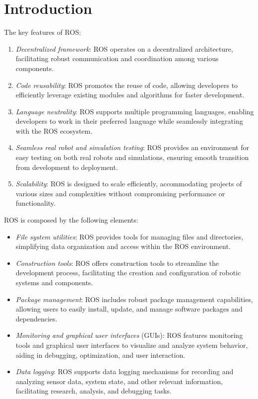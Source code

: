 \section{Introduction}

The key features of ROS:
\begin{enumerate}
    \item \textit{Decentralized framework}: ROS operates on a decentralized architecture, facilitating robust communication and coordination among various components.
    \item \textit{Code reusability}: ROS promotes the reuse of code, allowing developers to efficiently leverage existing modules and algorithms for faster development.
    \item \textit{Language neutrality}: ROS supports multiple programming languages, enabling developers to work in their preferred language while seamlessly integrating with the ROS ecosystem.
    \item \textit{Seamless real robot and simulation testing}: ROS provides an environment for easy testing on both real robots and simulations, ensuring smooth transition from development to deployment.
    \item \textit{Scalability}: ROS is designed to scale efficiently, accommodating projects of various sizes and complexities without compromising performance or functionality.
\end{enumerate}
ROS is composed by the following elements: 
\begin{itemize}
    \item \textit{File system utilities}: ROS provides tools for managing files and directories, simplifying data organization and access within the ROS environment.
    \item \textit{Construction tools}: ROS offers construction tools to streamline the development process, facilitating the creation and configuration of robotic systems and components.
    \item \textit{Package management}: ROS includes robust package management capabilities, allowing users to easily install, update, and manage software packages and dependencies.
    \item \textit{Monitoring and graphical user interfaces} (GUIs): ROS features monitoring tools and graphical user interfaces to visualize and analyze system behavior, aiding in debugging, optimization, and user interaction.
    \item \textit{Data logging}: ROS supports data logging mechanisms for recording and analyzing sensor data, system state, and other relevant information, facilitating research, analysis, and debugging tasks.
\end{itemize}